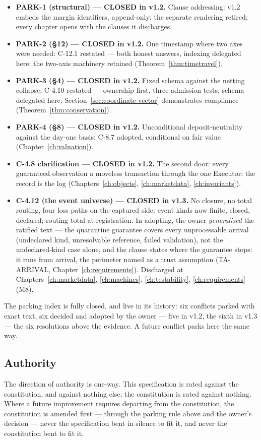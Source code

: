 \documentclass[11pt,a4paper]{article}
\begin{document}
\begin{itemize}
\item \textbf{PARK-1 (structural) --- CLOSED in v1.2.} Clause addressing: v1.2 embeds the
  margin identifiers, append-only; the separate rendering retired; every chapter opens with
  the clauses it discharges.
\item \textbf{PARK-2 (\S12) --- CLOSED in v1.2.} One timestamp where two axes were needed:
  C-12.1 restated --- both honest answers, indexing delegated here; the two-axis machinery
  retained (Theorem~\ref{thm:timetravel}).
\item \textbf{PARK-3 (\S4) --- CLOSED in v1.2.} Fixed schema against the netting collapse:
  C-4.10 restated --- ownership first, three admission tests, schema delegated here;
  Section~\ref{sec:coordinate-vector} demonstrates compliance
  (Theorem~\ref{thm:conservation}).
\item \textbf{PARK-4 (\S8) --- CLOSED in v1.2.} Unconditional deposit-neutrality against
  the day-one basis: C-8.7 adopted, conditional on fair value (Chapter~\ref{ch:valuation}).
\item \textbf{C-4.8 clarification --- CLOSED in v1.2.} The second door: every guaranteed
  observation a moveless transaction through the one Executor; the record is the log
  (Chapters~\ref{ch:objects}, \ref{ch:marketdata}, \ref{ch:invariants}).
\item \textbf{C-4.12 (the event universe) --- CLOSED in v1.3.} No closure, no total
  routing, four loss paths on the captured side: event kinds now finite, closed, declared;
  routing total at registration. In adopting, the owner \emph{generalised} the ratified
  text --- the quarantine guarantee covers every unprocessable arrival (undeclared kind,
  unresolvable reference, failed validation), not the undeclared-kind case alone, and the
  clause states where the guarantee stops: it runs from arrival, the perimeter named as a
  trust assumption (TA-ARRIVAL, Chapter~\ref{ch:requirements}). Discharged at
  Chapters~\ref{ch:marketdata}, \ref{ch:machines}, \ref{ch:testability},
  \ref{ch:requirements} (M8).
\end{itemize}

\noindent The parking index is fully closed, and live in its history: six conflicts
parked with exact text, six decided and adopted by the owner --- five in v1.2, the sixth
in v1.3 --- the six resolutions above the evidence. A future conflict parks here the same
way.

\subsection{Authority}

The direction of authority is one-way. This specification is rated against the
constitution, and against nothing else; the constitution is rated against nothing. Where a
future improvement requires departing from the constitution, the constitution is amended
first --- through the parking rule above and the owner's decision --- never the
specification bent in silence to fit it, and never the constitution bent to fit it.
\end{document}
